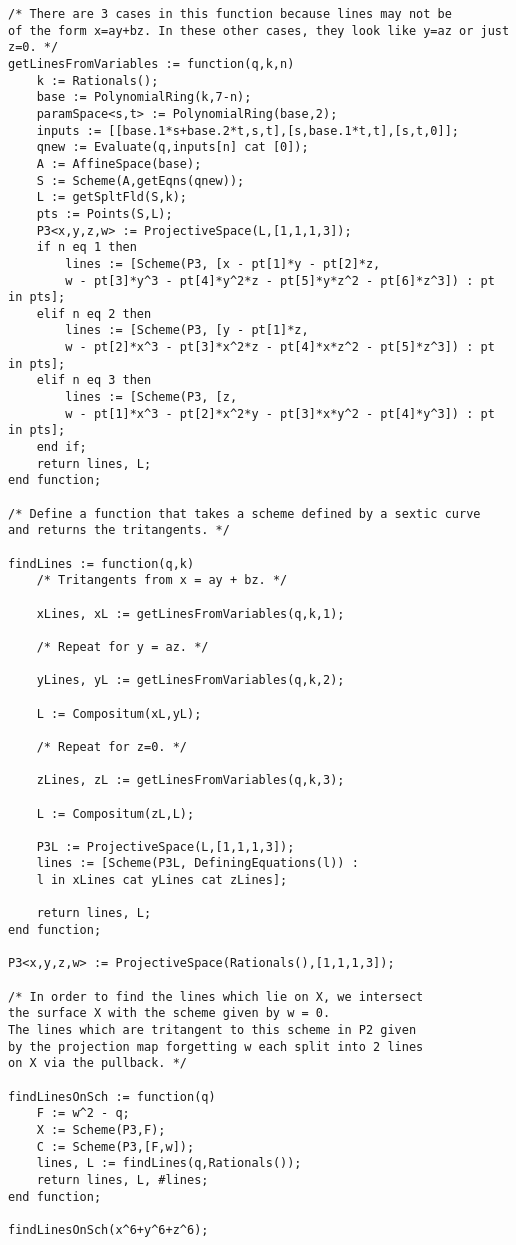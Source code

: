 \documentclass[12pt,twoside]{reedthesis}
\theoremstyle{plain}
\theoremstyle{definition}
\theoremstyle{remark}
\begin{document}
\begin{appendices}
\begin{verbatim}
/* There are 3 cases in this function because lines may not be 
of the form x=ay+bz. In these other cases, they look like y=az or just z=0. */
getLinesFromVariables := function(q,k,n)
	k := Rationals();
	base := PolynomialRing(k,7-n);
	paramSpace<s,t> := PolynomialRing(base,2);
	inputs := [[base.1*s+base.2*t,s,t],[s,base.1*t,t],[s,t,0]];
	qnew := Evaluate(q,inputs[n] cat [0]);
	A := AffineSpace(base);
	S := Scheme(A,getEqns(qnew));
	L := getSpltFld(S,k);
	pts := Points(S,L);
	P3<x,y,z,w> := ProjectiveSpace(L,[1,1,1,3]);
	if n eq 1 then
		lines := [Scheme(P3, [x - pt[1]*y - pt[2]*z, 
		w - pt[3]*y^3 - pt[4]*y^2*z - pt[5]*y*z^2 - pt[6]*z^3]) : pt in pts];
	elif n eq 2 then
		lines := [Scheme(P3, [y - pt[1]*z, 
		w - pt[2]*x^3 - pt[3]*x^2*z - pt[4]*x*z^2 - pt[5]*z^3]) : pt in pts];
	elif n eq 3 then
		lines := [Scheme(P3, [z, 
		w - pt[1]*x^3 - pt[2]*x^2*y - pt[3]*x*y^2 - pt[4]*y^3]) : pt in pts];
	end if;
	return lines, L;
end function;

/* Define a function that takes a scheme defined by a sextic curve 
and returns the tritangents. */

findLines := function(q,k)
	/* Tritangents from x = ay + bz. */

	xLines, xL := getLinesFromVariables(q,k,1);

	/* Repeat for y = az. */

	yLines, yL := getLinesFromVariables(q,k,2);

	L := Compositum(xL,yL);

	/* Repeat for z=0. */

	zLines, zL := getLinesFromVariables(q,k,3);

	L := Compositum(zL,L);

	P3L := ProjectiveSpace(L,[1,1,1,3]);
	lines := [Scheme(P3L, DefiningEquations(l)) : 
	l in xLines cat yLines cat zLines];

	return lines, L;
end function;

P3<x,y,z,w> := ProjectiveSpace(Rationals(),[1,1,1,3]);

/* In order to find the lines which lie on X, we intersect
the surface X with the scheme given by w = 0. 
The lines which are tritangent to this scheme in P2 given
by the projection map forgetting w each split into 2 lines
on X via the pullback. */

findLinesOnSch := function(q)
	F := w^2 - q;
	X := Scheme(P3,F);
	C := Scheme(P3,[F,w]);
	lines, L := findLines(q,Rationals());	
	return lines, L, #lines;
end function;

findLinesOnSch(x^6+y^6+z^6);
\end{verbatim}
\end{appendices}
\backmatter 



\end{document}
